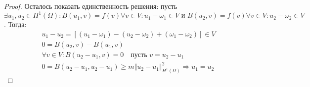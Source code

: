 \documentclass[__main__.tex]{subfiles}
\newcommand{\norm}[1]{\left\Vert{#1}\right\Vert}
\begin{document}
\begin{proof}
	Осталось показать единственность решения: пусть \({\exists}u_1,u_2{\in}H^1(\Omega){\colon}B(u_1,v)=f(v){\forall}v{\in}V{\colon}u_1-\omega_1{\in}V\text{ и }B(u_2,v)=f(v){\forall}v{\in}V{\colon}u_2-\omega_2{\in}V\). Тогда:
	\begin{gather*}
		u_1-u_2
		=
		\left[(u_1-\omega_1)-(u_2-\omega_2)+(\omega_1-\omega_2)\right]{\in}V
		\\
		0
		=
		B(u_2,v)-B(u_1,v)
		\\
		{\forall}v{\in}V{\colon}B(u_2-u_1,v)=0 \quad\text{пусть }v=u_2-u_1
		\\
		0
		=
		B(u_2-u_1,u_2-u_1){\ge}m\norm{u_2-u_1}^2_{H^1(\Omega)}{\Rightarrow}u_1=u_2
	\end{gather*}
\end{proof}
\end{document}
